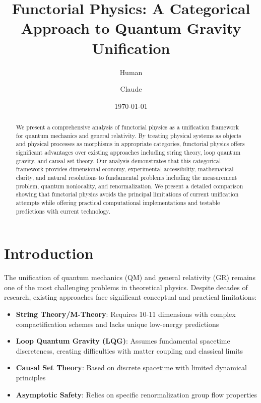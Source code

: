 \documentclass[11pt,a4paper]{article}
\title{Functorial Physics: A Categorical Approach to Quantum Gravity Unification}
\author[1]{Human}
\author[2]{Claude}
\affil[1]{Independent Researcher}
\affil[2]{Anthropic AI Research Assistant}
\date{\today}
\begin{document}
\maketitle

\begin{abstract}
We present a comprehensive analysis of functorial physics as a unification framework for quantum mechanics and general relativity. By treating physical systems as objects and physical processes as morphisms in appropriate categories, functorial physics offers significant advantages over existing approaches including string theory, loop quantum gravity, and causal set theory. Our analysis demonstrates that this categorical framework provides dimensional economy, experimental accessibility, mathematical clarity, and natural resolutions to fundamental problems including the measurement problem, quantum nonlocality, and renormalization. We present a detailed comparison showing that functorial physics avoids the principal limitations of current unification attempts while offering practical computational implementations and testable predictions with current technology.
\end{abstract}

\tableofcontents

\section{Introduction}

The unification of quantum mechanics (QM) and general relativity (GR) remains one of the most challenging problems in theoretical physics. Despite decades of research, existing approaches face significant conceptual and practical limitations:

\begin{itemize}
    \item \textbf{String Theory/M-Theory}: Requires 10-11 dimensions with complex compactification schemes and lacks unique low-energy predictions
    \item \textbf{Loop Quantum Gravity (LQG)}: Assumes fundamental spacetime discreteness, creating difficulties with matter coupling and classical limits
    \item \textbf{Causal Set Theory}: Based on discrete spacetime with limited dynamical principles
    \item \textbf{Asymptotic Safety}: Relies on specific renormalization group flow properties
\end{itemize}
\end{document}
